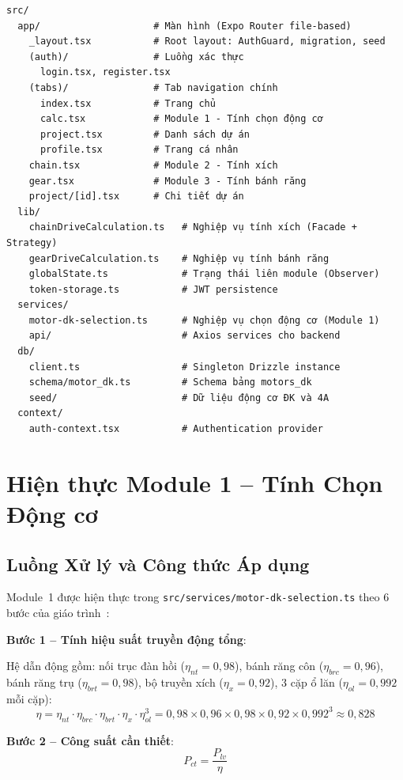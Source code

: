 \begin{verbatim}
src/
  app/                    # Màn hình (Expo Router file-based)
    _layout.tsx           # Root layout: AuthGuard, migration, seed
    (auth)/               # Luồng xác thực
      login.tsx, register.tsx
    (tabs)/               # Tab navigation chính
      index.tsx           # Trang chủ
      calc.tsx            # Module 1 - Tính chọn động cơ
      project.tsx         # Danh sách dự án
      profile.tsx         # Trang cá nhân
    chain.tsx             # Module 2 - Tính xích
    gear.tsx              # Module 3 - Tính bánh răng
    project/[id].tsx      # Chi tiết dự án
  lib/
    chainDriveCalculation.ts   # Nghiệp vụ tính xích (Facade + Strategy)
    gearDriveCalculation.ts    # Nghiệp vụ tính bánh răng
    globalState.ts             # Trạng thái liên module (Observer)
    token-storage.ts           # JWT persistence
  services/
    motor-dk-selection.ts      # Nghiệp vụ chọn động cơ (Module 1)
    api/                       # Axios services cho backend
  db/
    client.ts                  # Singleton Drizzle instance
    schema/motor_dk.ts         # Schema bảng motors_dk
    seed/                      # Dữ liệu động cơ ĐK và 4A
  context/
    auth-context.tsx           # Authentication provider
\end{verbatim}

\section{Hiện thực Module 1 -- Tính Chọn Động cơ}
\label{sec:impl-m1}

\subsection{Luồng Xử lý và Công thức Áp dụng}

Module~1 được hiện thực trong \texttt{src/services/motor-dk-selection.ts}
theo 6 bước của giáo trình~\cite{trinh2006tinh}:

\textbf{Bước 1 -- Tính hiệu suất truyền động tổng}:

Hệ dẫn động gồm: nối trục đàn hồi ($\eta_{nt} = 0{,}98$),
bánh răng côn ($\eta_{brc} = 0{,}96$), bánh răng trụ ($\eta_{brt} = 0{,}98$),
bộ truyền xích ($\eta_x = 0{,}92$), 3 cặp ổ lăn ($\eta_{ol} = 0{,}992$ mỗi cặp):
\[
  \eta = \eta_{nt} \cdot \eta_{brc} \cdot \eta_{brt} \cdot \eta_x \cdot \eta_{ol}^3
       = 0{,}98 \times 0{,}96 \times 0{,}98 \times 0{,}92 \times 0{,}992^3
       \approx 0{,}828
\]

\textbf{Bước 2 -- Công suất cần thiết}:
\[
  P_{ct} = \frac{P_{lv}}{\eta}
\]

